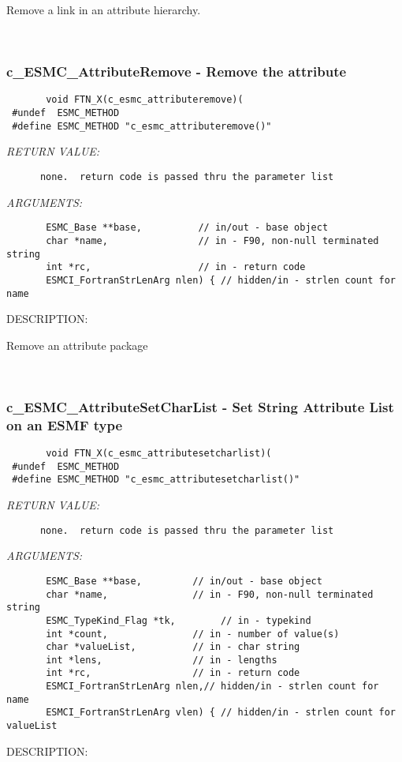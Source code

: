        Remove a link in an attribute hierarchy.
   
 
\mbox{}\hrulefill\ 
 
\subsubsection [c\_ESMC\_AttributeRemove] {c\_ESMC\_AttributeRemove - Remove the attribute}


  
\begin{verbatim}       void FTN_X(c_esmc_attributeremove)(
 #undef  ESMC_METHOD
 #define ESMC_METHOD "c_esmc_attributeremove()"\end{verbatim}{\em RETURN VALUE:}
\begin{verbatim}      none.  return code is passed thru the parameter list
   \end{verbatim}{\em ARGUMENTS:}
\begin{verbatim}       ESMC_Base **base,          // in/out - base object
       char *name,                // in - F90, non-null terminated string
       int *rc,                   // in - return code     
       ESMCI_FortranStrLenArg nlen) { // hidden/in - strlen count for name
   \end{verbatim}
{\sf DESCRIPTION:\\ }


      Remove an attribute package
   
 
\mbox{}\hrulefill\ 
 
\subsubsection [c\_ESMC\_AttributeSetCharList] {c\_ESMC\_AttributeSetCharList - Set String Attribute List on an ESMF type}


  
\begin{verbatim}       void FTN_X(c_esmc_attributesetcharlist)(
 #undef  ESMC_METHOD
 #define ESMC_METHOD "c_esmc_attributesetcharlist()"\end{verbatim}{\em RETURN VALUE:}
\begin{verbatim}      none.  return code is passed thru the parameter list
   \end{verbatim}{\em ARGUMENTS:}
\begin{verbatim}       ESMC_Base **base,         // in/out - base object
       char *name,               // in - F90, non-null terminated string
       ESMC_TypeKind_Flag *tk,        // in - typekind
       int *count,               // in - number of value(s)
       char *valueList,          // in - char string
       int *lens,                // in - lengths
       int *rc,                  // in - return code
       ESMCI_FortranStrLenArg nlen,// hidden/in - strlen count for name
       ESMCI_FortranStrLenArg vlen) { // hidden/in - strlen count for valueList
   \end{verbatim}
{\sf DESCRIPTION:\\ }


